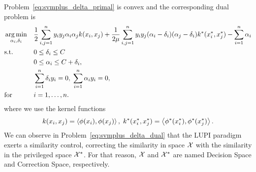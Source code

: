 Problem~\eqref{eq:svmplus_delta_primal} is convex and the corresponding dual problem is
\begin{equation}\label{eq:svmplus_delta_dual}
    \begin{aligned}
        & \argmin_{\alpha_i, \delta_i} 
        & & \frac{1}{2} \sum_{i, j=1}^\nsamples y_i y_j \alpha_i \alpha_j k(x_i, x_j) +\frac{1}{2 \mu} \sum_{i, j=1}^\nsamples y_i y_j (\alpha_i - \delta_i) (\alpha_j - \delta_i) k^*(x^*_i, x^*_j)  - \sum_{i=1}^\nsamples \alpha_i \\
        & \text{s.t.}
        & & 0 \leq \delta_i \leq C \\
        & & & 0 \leq \alpha_i \leq C + \delta_i, \\
        & & & \sum_{i=1}^{\nsamples}{\delta_i y_i} = 0, \; 
        \sum_{i=1}^{\nsamples}{\alpha_i y_i} = 0, \\
        & \text{for } & & i=1, \ldots, \nsamples.
        \end{aligned}
\end{equation}
where we use the kernel functions
$$k(x_i, x_j) = \left\langle \phi(x_i), \phi(x_j) \right\rangle, \; k^*(x^*_i, x^*_j) = \left\langle \phi^*(x^*_i), \phi^*(x^*_j) \right\rangle.$$ 
We can observe in Problem~\eqref{eq:svmplus_delta_dual} that the LUPI paradigm exerts a similarity control, correcting the similarity in space $\mathcal{X}$ with the similarity in the privileged space $\mathcal{X}^*$. For that reason, $\mathcal{X}$ and $\mathcal{X}^*$ are named Decision Space and Correction Space, respectively.


